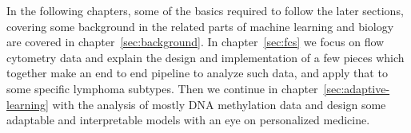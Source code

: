 In the following chapters, some of the basics required to follow the later
sections, covering some background in the related parts of machine learning and
biology are covered in chapter~\ref{sec:background}. In chapter~\ref{sec:fcs} we
focus on flow cytometry data and explain the design and implementation of a few
pieces which together make an end to end pipeline to analyze such data, and
apply that to some specific lymphoma subtypes. Then we continue in
chapter~\ref{sec:adaptive-learning} with the analysis of mostly DNA methylation
data and design some adaptable and interpretable models with an eye on
personalized medicine.
